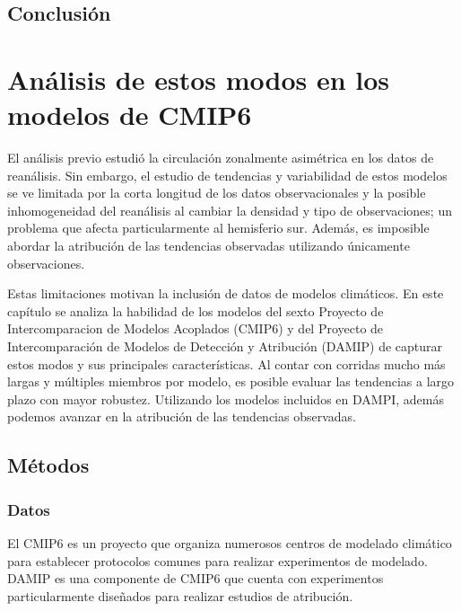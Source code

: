 \documentclass[12pt,oneside]{reedthesis}
\begin{document}
\hypertarget{conclusiuxf3n-1}{%
\section{Conclusión}\label{conclusiuxf3n-1}}


\hypertarget{anuxe1lisis-de-estos-modos-en-los-modelos-de-cmip6}{%
\chapter{Análisis de estos modos en los modelos de CMIP6}\label{anuxe1lisis-de-estos-modos-en-los-modelos-de-cmip6}}

El análisis previo estudió la circulación zonalmente asimétrica en los datos de reanálisis.
Sin embargo, el estudio de tendencias y variabilidad de estos modelos se ve limitada por la corta longitud de los datos observacionales y la posible inhomogeneidad del reanálisis al cambiar la densidad y tipo de observaciones; un problema que afecta particularmente al hemisferio sur.
Además, es imposible abordar la atribución de las tendencias observadas utilizando únicamente observaciones.

Estas limitaciones motivan la inclusión de datos de modelos climáticos.
En este capítulo se analiza la habilidad de los modelos del sexto Proyecto de Intercomparacion de Modelos Acoplados (CMIP6) y del Proyecto de Intercomparación de Modelos de Detección y Atribución (DAMIP) de capturar estos modos y sus principales características.
Al contar con corridas mucho más largas y múltiples miembros por modelo, es posible evaluar las tendencias a largo plazo con mayor robustez.
Utilizando los modelos incluidos en DAMPI, además podemos avanzar en la atribución de las tendencias observadas.

\hypertarget{muxe9todos-4}{%
\section{Métodos}\label{muxe9todos-4}}

\hypertarget{datos-1}{%
\subsection{Datos}\label{datos-1}}

El CMIP6 es un proyecto que organiza numerosos centros de modelado climático para establecer protocolos comunes para realizar experimentos de modelado.
DAMIP es una componente de CMIP6 que cuenta con experimentos particularmente diseñados para realizar estudios de atribución.
\end{document}
